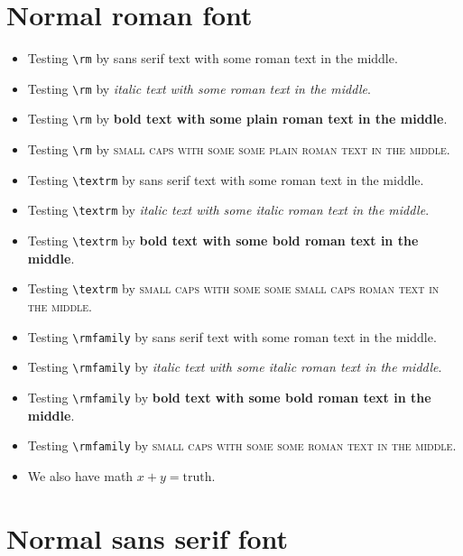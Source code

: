 \documentclass{article}
\begin{document}
\section{Normal roman font}

\begin{itemize}
\item
Testing \verb#\rm# by \textsf{sans serif text with {\rm some roman text} in the middle}.
\item
Testing \verb#\rm# by \textit{italic text with {\rm some roman text} in the middle}.
\item
Testing \verb#\rm# by \textbf{bold text with {\rm some plain roman text} in the middle}.
\item
Testing \verb#\rm# by \textsc{small caps with some {\rm some plain roman text} in the middle}.
\item
Testing \verb#\textrm# by \textsf{sans serif text with \textrm{some roman text} in the middle}.
\item
Testing \verb#\textrm# by \textit{italic text with \textrm{some italic roman text} in the middle}.
\item
Testing \verb#\textrm# by \textbf{bold text with \textrm{some bold roman text} in the middle}.
\item
Testing \verb#\textrm# by \textsc{small caps with some \textrm{some small caps roman text} in the middle}.
\item
Testing \verb#\rmfamily# by \textsf{sans serif text with {\rmfamily some roman text} in the middle}.
\item
Testing \verb#\rmfamily# by \textit{italic text with {\rmfamily some italic roman text} in the middle}.
\item
Testing \verb#\rmfamily# by \textbf{bold text with {\rmfamily some bold roman text} in the middle}.
\item
Testing \verb#\rmfamily# by \textsc{small caps with some {\rmfamily some roman text} in the middle}.
\item
We also have math $x+y = \mathrm{truth}$.
\end{itemize}

\section{Normal sans serif font}
\end{document}
